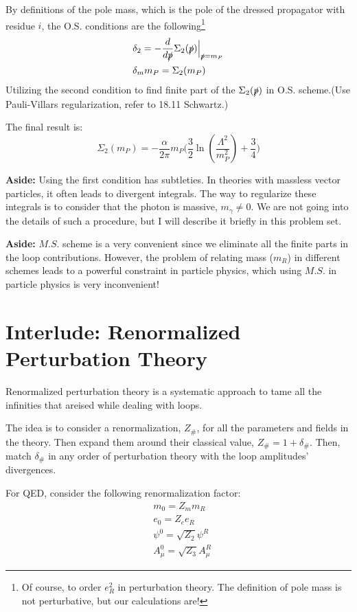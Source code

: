 \documentclass[11pt]{article}
\begin{document}
\begin{enumerate}
\begin{problem}{\points{-}}
	 By definitions of the pole mass, which is the pole of the dressed propagator with residue $i$, the O.S. conditions are the following\footnote{Of course, to order $e_R^2$ in perturbation theory. The definition of pole mass is not perturbative, but our calculations are!}
	\begin{equation}
		\begin{aligned}
			&\delta_2 = - \frac{d}{d\slashed{p}} \Sigma_2(\slashed{p})\Big|_{\slashed{p} = m_P}
			\\&
			\delta_m m_P = \Sigma_2(m_P)
		\end{aligned}
	\end{equation}
Utilizing the second condition to find finite part of the $\Sigma_2(\slashed{p})$ in O.S. scheme.(Use Pauli-Villars regularization, refer to 18.11 Schwartz.)

The final result is:
\[
\Sigma_2(m_P) = -\frac{\alpha}{2\pi} m_P \big(
\frac32 \ln(\frac{\Lambda^2}{m_P^2}) + \frac34
\big)
\]
\end{problem}


\textbf{Aside:} Using the first condition has subtleties. In theories with massless vector particles, it often leads to divergent integrals. The way to regularize these integrals is to consider that the photon is massive, $m_\gamma\neq 0$. We are not going into the details of such a procedure, but I will describe it briefly in this problem set.

\textbf{Aside:} $M.S.$ scheme is a very convenient since we eliminate all the finite parts in the loop contributions. However, the problem of relating mass ($m_R$) in different schemes leads to a powerful constraint in particle physics, which using $M.S.$ in particle physics is very inconvenient! 
\end{enumerate}
\newpage
	\section*{Interlude: Renormalized Perturbation Theory}
		Renormalized perturbation theory is a systematic approach to tame all the infinities that areised while dealing with loops.
		
		The idea is to consider a renormalization, $Z_\#$, for all the parameters and fields in the theory. Then expand them around their classical value, $Z_\# = 1+ \delta_\#$. Then, match $\delta_\#$ in any order of perturbation theory with the loop amplitudes' divergences.
		
		For QED, consider the following renormalization factor:
		\begin{equation}
			\begin{aligned}
				&m_0 = Z_mm_R \\&
				e_0 = Z_e e_R \\&
				\psi^0 = \sqrt{Z_2} \psi^R \\&
				A_\mu^0 = \sqrt{Z_3} A_\mu^R
			\end{aligned}
		\label{renorz}
		\end{equation}
\end{document}
